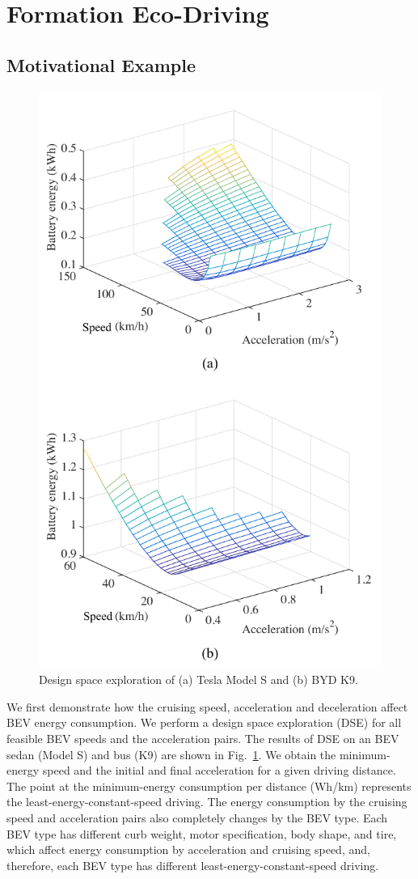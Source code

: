 \documentclass{IEEEtran}
\begin{document}
\section{Formation Eco-Driving}\label{sec:problem}

\subsection{Motivational Example}

\begin{figure}	%
\centering
\includegraphics[width=0.8\hsize]{Figures/DSE.pdf}
\caption{Design space exploration of (a) Tesla Model S and (b) BYD K9.}
\label{fig:DSE}
\end{figure} 


We first demonstrate how the cruising speed, acceleration and deceleration affect BEV energy consumption. We perform a design space exploration (DSE) for all feasible BEV speeds and the acceleration pairs. The results of DSE on an BEV sedan (Model S) and bus (K9) are shown in Fig.~\ref{fig:DSE}. 
We obtain the minimum-energy speed and the initial and final acceleration for a given driving distance. 
The point at the minimum-energy consumption per distance (Wh/km) represents the least-energy-constant-speed driving. The energy consumption by the cruising speed and acceleration pairs also completely changes by the BEV type. 
Each BEV type has different curb weight, motor specification, body shape, and tire, which affect energy consumption by acceleration and cruising speed, and, therefore, each BEV type has different least-energy-constant-speed driving.
\end{document}
